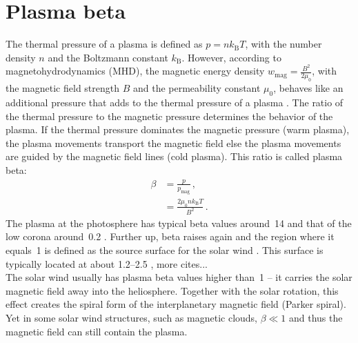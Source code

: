 \section{Plasma beta}
\label{sec:plasma_beta}
The thermal pressure of a plasma is defined as $p = n k_\text{B} T$, with the number density $n$ and the Boltzmann constant $k_\text{B}$. However, according to magnetohydrodynamics (MHD), the magnetic energy density $w_\text{mag} = \frac{B^2}{2 \mu_0}$, with the magnetic field strength $B$ and the permeability constant $\mu_0$, behaves like an additional pressure that adds to the thermal pressure of a plasma \citep[p.~50]{Kivelson1995}. The ratio of the thermal pressure to the magnetic pressure determines the behavior of the plasma. If the thermal pressure dominates the magnetic pressure (warm plasma), the plasma movements transport the magnetic field else the plasma movements are guided by the magnetic field lines (cold plasma). This ratio is called plasma beta:
\begin{align}
	\beta &= \frac{p}{p_\text{mag}}	\,,\\
	&= \frac{2 \mu_0 n k_\text{B} T}{B^2}	\,.
\end{align}
The plasma at the photosphere has typical beta values around~14 and that of the low corona around~0.2 \citep{Gary2001}. Further up, beta raises again and the region where it equals~1 is defined as the source surface for the solar wind \citep{Schatten1969}.	%
This surface is typically located at about \SIrange{1.2}{2.5}{\Rs} \citep{Gary2001}, more cites...\\

The solar wind usually has plasma beta values higher than~1 -- it carries the solar magnetic field away into the heliosphere. Together with the solar rotation, this effect creates the spiral form of the interplanetary magnetic field (Parker spiral). Yet in some solar wind structures, such as magnetic clouds, $\beta \ll 1$ and thus the magnetic field can still contain the plasma.\\




